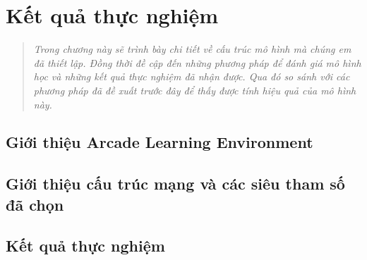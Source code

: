 \chapter{Kết quả thực nghiệm}
\begin{quote}
	\textit{Trong chương này sẽ trình bày chi tiết về cấu trúc mô hình mà chúng em đã thiết lập. Đồng thời đề cập đến những phương pháp để đánh giá mô hình học và những kết quả thực nghiệm đã nhận được. Qua đó so sánh với các phương pháp đã đề xuất trước đây để thấy được tính hiệu quả của mô hình này.}
\end{quote}
 
\section{Giới thiệu Arcade Learning Environment}
\section{Giới thiệu cấu trúc mạng và các siêu tham số đã chọn}
\section{Kết quả thực nghiệm}
